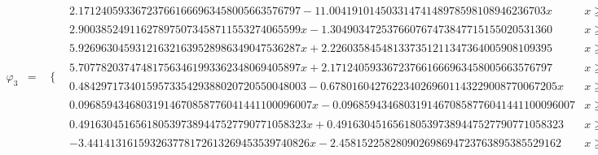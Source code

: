 \documentclass{article}
\begin{document}
\begin{landscape}
\begin{eqnarray*}
\begin{array}{cc}
\end{array}\\
\varphi_3 & = & \begin{array}{cc}
 \{ & 
\begin{array}{cc}
 2.171240593367237661666963458005663576797-11.00419101450331474148978598108946236703 x & x\geq 0\land x<\frac{1}{4} \\
 2.900385249116278975073458711553274065599 x-1.304903472537660767473847715155020531360 & x\geq \frac{1}{4}\land x<\frac{1}{2} \\
 5.926963045931216321639528986349047536287 x+2.226035845481337351211347364005908109395 & x\geq -\frac{1}{2}\land x<-\frac{1}{4} \\
 5.707782037474817563461993362348069405897 x+2.171240593367237661666963458005663576797 & x\geq -\frac{1}{4}\land x<0 \\
 0.4842971734015957335429388020720550048003-0.6780160427622340269601143229008770067205 x & x\geq \frac{1}{2}\land x<\frac{3}{4} \\
 0.09685943468031914670858776041441100096007 x-0.09685943468031914670858776041441100096007 & x\geq \frac{3}{4}\land x<1 \\
 0.4916304516561805397389447527790771058323 x+0.4916304516561805397389447527790771058323 & x\geq -1\land x<-\frac{3}{4} \\
 -3.441413161593263778172613269453539740826 x-2.458152258280902698694723763895385529162 & x\geq -\frac{3}{4}\land x<-\frac{1}{2}
\end{array}

\end{array}\end{eqnarray*}
\end{landscape}
\end{document}
